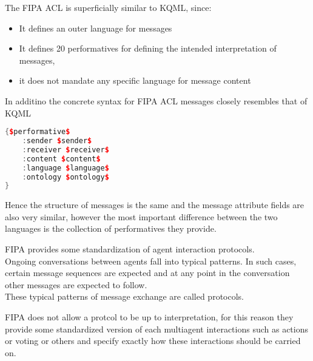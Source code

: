 The FIPA ACL is superficially similar to KQML, since:
\begin{itemize}
\item It defines an outer language for messages
\item It defines 20 performatives for defining the intended interpretation of messages,
\item it does not mandate any specific language for message content
\end{itemize}
In additino the concrete syntax for FIPA ACL messages closely resembles that of KQML

\begin{lstlisting}[language=C++]
{$performative$
	:sender $sender$
	:receiver $receiver$
	:content $content$
	:language $language$
	:ontology $ontology$
}
\end{lstlisting}
Hence the structure of messages is the same and the message attribute fields are also very similar, however the most important difference between the two languages is the collection of performatives they provide.

FIPA provides some standardization of agent interaction protocols.\\
Ongoing conversations between agents fall into typical patterns. In such cases, certain message sequences are expected and at any point in the conversation other messages are expected to follow.\\
These typical patterns of message exchange are called protocols.

FIPA does not allow a protcol to be up to interpretation, for this reason they provide some  standardized version of each multiagent interactions  such as actions or voting or others and specify exactly how these interactions should be carried on.
	